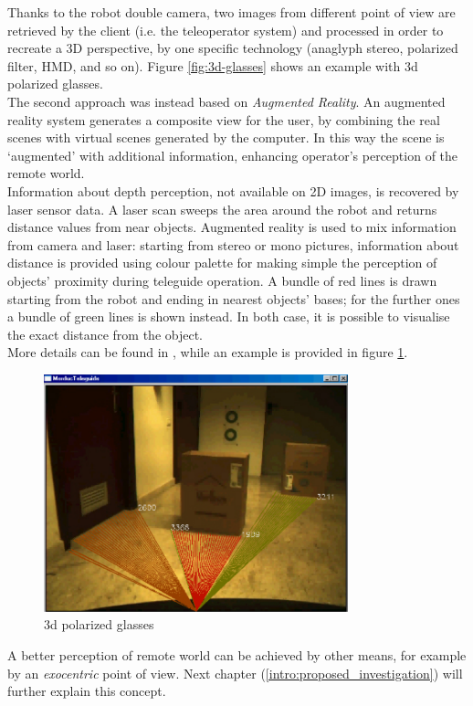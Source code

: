 Thanks to the robot double camera, two images from different point of
view are retrieved by the client (i.e. the teleoperator system) and
processed in order to recreate a 3D perspective, by one specific
technology (anaglyph stereo, polarized filter, HMD, and so on).
Figure \ref{fig:3d-glasses} shows an example with 3d polarized
glasses.
\\
The second approach was instead based on \textit{Augmented Reality}.
An augmented reality system generates a composite view for the user,
by combining the real scenes with virtual scenes generated by the
computer. In this way the scene is `augmented' with additional
information, enhancing operator's perception of the remote world.
\\
Information about depth perception, not available on
2D images, is recovered by laser sensor data. A laser scan sweeps the area
around the robot and returns distance values from near objects. Augmented
reality is used to mix information from camera and laser: starting from
stereo or mono pictures, information about distance is provided using colour
palette for making simple the perception of objects' proximity during
teleguide operation. A bundle of red lines is drawn starting from the robot
and ending in nearest objects' bases; for the further ones a bundle of green
lines is shown instead. In both case, it is possible to visualise the
exact distance from the object.
\\
More details can be found in \cite{morduc:macalusodetommaso}, while an
example is provided in figure \ref{fig:augmented_morduc}.

\begin{figure} [h]
  \begin{center}
    \includegraphics[width=250pt]{img/augmented_morduc.png}
    \caption{3d polarized glasses}
    \label{fig:augmented_morduc}
  \end{center}
\end{figure}

A better perception of remote world can be achieved by other means,
for example by an \textit{exocentric} point of view. Next chapter
(\ref{intro:proposed_investigation}) will further explain this concept.
